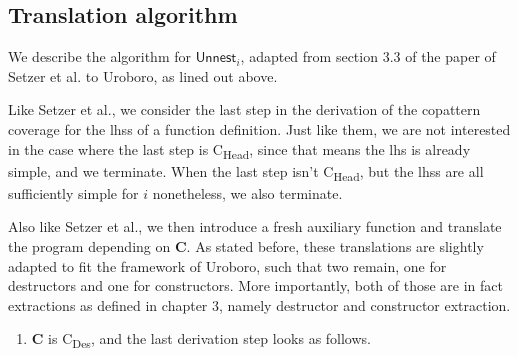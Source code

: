 \subsection{Translation algorithm}

We describe the algorithm for $\textsf{Unnest}_i$, adapted from section 3.3 of the paper of Setzer et al. to Uroboro, as lined out above.

\begin{algorithm}

Like Setzer et al., we consider the last step in the derivation of the copattern coverage for the lhss of a function definition. Just like them, we are not interested in the case where the last step is C\textsubscript{Head}, since that means the lhs is already simple, and we terminate. When the last step isn't C\textsubscript{Head}, but the lhss are all sufficiently simple for $i$ nonetheless, we also terminate.

\begin{prooftree}
\end{prooftree}

Also like Setzer et al., we then introduce a fresh auxiliary function and translate the program depending on \textbf{C}. As stated before, these translations are slightly adapted to fit the framework of Uroboro, such that two remain, one for destructors and one for constructors. More importantly, both of those are in fact extractions as defined in chapter 3, namely destructor and constructor extraction. 

\begin{enumerate}
\item \textbf{C} is C\textsubscript{Des}, and the last derivation step looks as follows.

\begin{prooftree}
\end{prooftree}


\end{enumerate}
\end{algorithm}
